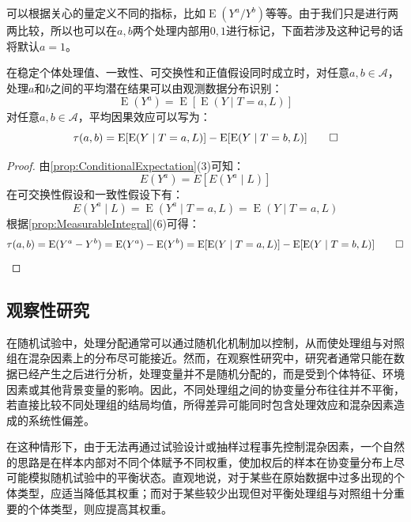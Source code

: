 \begin{definition}
	可以根据关心的量定义不同的指标，比如$\operatorname{E}(Y^a/Y^b)$等等。由于我们只是进行两两比较，所以也可以在$a,b$两个处理内部用$0,1$进行标记，下面若涉及这种记号的话将默认$a=1$。
\end{definition}
\begin{theorem}\label{theo:GFormulaIdentification}
	在稳定个体处理值、一致性、可交换性和正值假设同时成立时，对任意$a,b\in\mathcal{A}$，处理$a$和$b$之间的平均潜在结果可以由观测数据分布识别：
	\begin{equation*}
		\operatorname{E}(Y^a)=\operatorname{E}[\operatorname{E}(Y\mid T=a,L)]
	\end{equation*}
	对任意$a,b\in\mathcal{A}$，平均因果效应可以写为：
	\begin{equation*}
		\tau(a,b)=\operatorname{E}[\operatorname{E}(Y\mid T=a,L)]-\operatorname{E}[\operatorname{E}(Y\mid T=b,L)]\qedhere
	\end{equation*}
\end{theorem}
\begin{proof}
	由\cref{prop:ConditionalExpectation}(3)可知：
	\begin{equation*}
		E(Y^a)=E[E(Y^a\mid L)]
	\end{equation*}
	在可交换性假设和一致性假设下有：
	\begin{equation*}
		E(Y^a\mid L)=\operatorname{E}(Y^a\mid T=a,L)=\operatorname{E}(Y\mid T=a,L)
	\end{equation*}
	根据\cref{prop:MeasurableIntegral}(6)可得：
	\begin{equation*}
		\tau(a,b)=\operatorname{E}(Y^a-Y^b)=\operatorname{E}(Y^a)-\operatorname{E}(Y^b)=\operatorname{E}[\operatorname{E}(Y\mid T=a,L)]-\operatorname{E}[\operatorname{E}(Y\mid T=b,L)]\qedhere
	\end{equation*}
\end{proof}

\subsection{观察性研究}
在随机试验中，处理分配通常可以通过随机化机制加以控制，从而使处理组与对照组在混杂因素上的分布尽可能接近。然而，在观察性研究中，研究者通常只能在数据已经产生之后进行分析，处理变量并不是随机分配的，而是受到个体特征、环境因素或其他背景变量的影响。因此，不同处理组之间的协变量分布往往并不平衡，若直接比较不同处理组的结局均值，所得差异可能同时包含处理效应和混杂因素造成的系统性偏差。\par
在这种情形下，由于无法再通过试验设计或抽样过程事先控制混杂因素，一个自然的思路是在样本内部对不同个体赋予不同权重，使加权后的样本在协变量分布上尽可能模拟随机试验中的平衡状态。直观地说，对于某些在原始数据中过多出现的个体类型，应适当降低其权重；而对于某些较少出现但对平衡处理组与对照组十分重要的个体类型，则应提高其权重。
